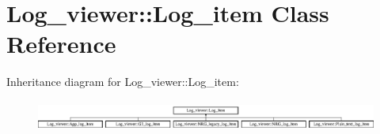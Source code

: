 \hypertarget{class_log__viewer_1_1_log__item}{\section{Log\-\_\-viewer\-:\-:Log\-\_\-item Class Reference}
\label{class_log__viewer_1_1_log__item}
}
Inheritance diagram for Log\-\_\-viewer\-:\-:Log\-\_\-item\-:\begin{figure}[H]
\begin{center}
\leavevmode
\includegraphics[height=1.037037cm]{class_log__viewer_1_1_log__item}
\end{center}
\end{figure}
